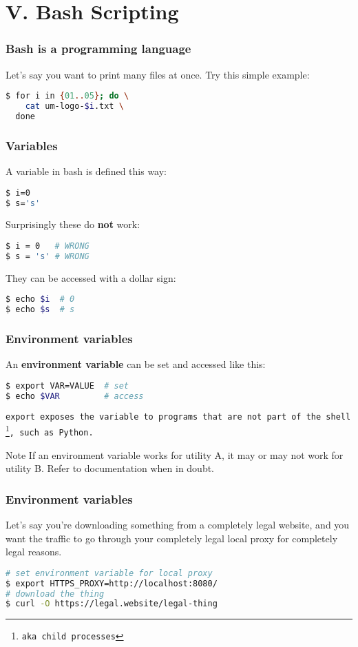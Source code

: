 \section{V. Bash Scripting}
\begin{frame}[fragile]
\frametitle{Bash is a programming language}
Let's say you want to print many files at once.
\newline \newline
Try this simple example:
\begin{lstlisting}[language=bash]
$ for i in {01..05}; do \
    cat um-logo-$i.txt \
  done
\end{lstlisting}
\end{frame}

\begin{frame}[fragile]
\frametitle{Variables}
A variable in bash is defined this way:
\begin{lstlisting}[language=bash]
$ i=0
$ s='s'
\end{lstlisting}
Surprisingly these do \textbf{not} work:
\begin{lstlisting}[language=bash]
$ i = 0   # WRONG
$ s = 's' # WRONG
\end{lstlisting}
They can be accessed with a dollar sign:
\begin{lstlisting}[language=bash]
$ echo $i  # 0
$ echo $s  # s
\end{lstlisting}
\end{frame}

\begin{frame}[fragile]
\frametitle{Environment variables}
An \textbf{environment variable} can be set and accessed like this:
\begin{lstlisting}[language=bash]
$ export VAR=VALUE  # set
$ echo $VAR         # access
\end{lstlisting}
\tt{export} exposes the variable to programs that are not part of the shell
\footnote{aka child processes}, such as Python.
\begin{block}{Note}
    If an environment variable works for utility A, it may or may not work
    for utility B. Refer to documentation when in doubt.
\end{block}
\end{frame}

\begin{frame}[fragile]
\frametitle{Environment variables}
Let's say you're downloading something from a completely legal website,
and you want the traffic to go through your completely legal local proxy
for completely legal reasons.
\begin{lstlisting}[language=bash]
# set environment variable for local proxy
$ export HTTPS_PROXY=http://localhost:8080/
# download the thing
$ curl -O https://legal.website/legal-thing
\end{lstlisting}
\end{frame}

